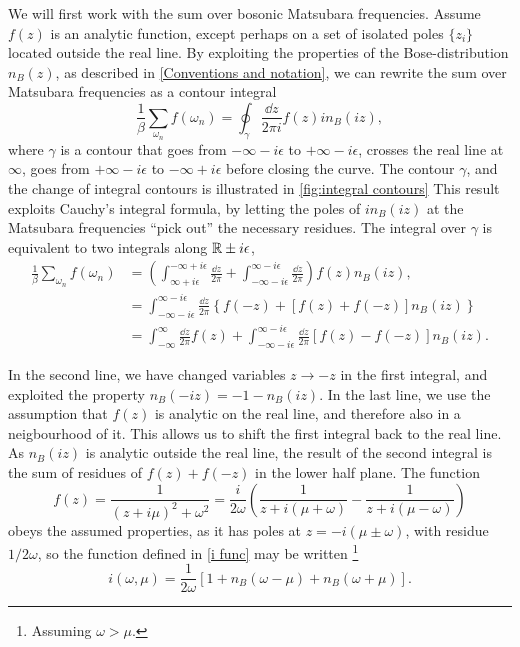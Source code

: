 We will first work with the sum over bosonic Matsubara frequencies.
Assume $f(z)$ is an analytic function, except perhaps on a set of isolated poles $\{z_i\}$ located outside the real line. 
By exploiting the properties of the Bose-distribution $n_B(z)$, as described in \autoref{Conventions and notation}, we can rewrite the sum over Matsubara frequencies as a contour integral
\begin{equation*}
    \frac{1}{\beta} \sum_{\omega_n} f(\omega_n) 
    = \oint_\gamma \frac{\dd z}{2 \pi i} f(z) i n_B(i z),
\end{equation*}
where $\gamma$ is a contour that goes from $- \infty - i \epsilon$ to $+ \infty - i \epsilon$, crosses the real line at $\infty$, goes from $+ \infty - i \epsilon$ to $- \infty + i \epsilon$ before closing the curve.
The contour $\gamma$, and the change of integral contours is illustrated in \autoref{fig:integral contours}
This result exploits Cauchy's integral formula, by letting the poles of $in_B(iz)$ at the Matsubara frequencies ``pick out'' the necessary residues.
The integral over $\gamma$ is equivalent to two integrals along $\mathbb{R} \pm i \epsilon$,
\begin{align}
    \nonumber
    \frac{1}{\beta} \sum_{\omega_n} f(\omega_n) 
    &= \left(
        \int_{\infty + i \epsilon}^{-\infty + i \epsilon} \frac{\dd z}{2 \pi} 
        + \int_{-\infty - i \epsilon}^{\infty - i \epsilon}\frac{\dd z}{2 \pi}
    \right) 
    f(z) n_B(i z),
    \\
    \nonumber
    & = \int_{-\infty - i \epsilon}^{\infty - i \epsilon}\frac{\dd z}{2 \pi}
    \left\{
        f(-z) + \left[f(z) + f(-z)\right] n_B(iz)
    \right\} 
    \\
    \label{bosonic sum to integral}
    & = \int_{-\infty}^{\infty} \frac{\dd z}{2 \pi} f(z)
    +
    \int_{-\infty - i \epsilon}^{\infty - i \epsilon}\frac{\dd z}{2 \pi}
    \left[
        f(z) - f(-z)
    \right]
    n_B(iz).
\end{align}

In the second line, we have changed variables $z \rightarrow -z$ in the first integral, and exploited the property $n_B(-i z) = -1 - n_B(iz)$.
In the last line, we use the assumption that $f(z)$ is analytic on the real line, and therefore also in a neigbourhood of it. 
This allows us to shift the first integral back to the real line.
As $n_B(iz)$ is analytic outside the real line, the result of the second integral is the sum of residues of $f(z) + f(-z)$ in the lower half plane.
The function
\begin{equation}
    f(z) = \frac{1}{(z + i \mu)^2 + \omega^2} 
    = \frac{i}{2 \omega } 
    \left(
        \frac{1}{z + i(\mu + \omega)} - \frac{1}{z + i(\mu - \omega)}
    \right)
\end{equation}
obeys the assumed properties, as it has poles at
$z = - i (\mu \pm \omega)$, with residue $1 / 2 \omega$, so the function defined in \autoref{i func} may be written \footnote{Assuming $\omega>\mu$.}
\begin{equation}
    i(\omega, \mu) 
    = \frac{1}{2\omega}
    [1 + n_B(\omega - \mu) + n_B(\omega + \mu)].
\end{equation}

